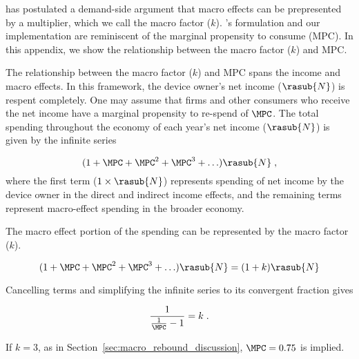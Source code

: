 
\citet{Borenstein:2015aa} has postulated a demand-side argument that macro effects 
can be prepresented by a multiplier, which we call the macro factor ($k$).
\citeauthor{Borenstein:2015aa}'s formulation and our implementation 
are reminiscent of the marginal propensity to consume (MPC).
In this appendix, we show the relationship between the macro factor ($k$) and MPC.

The relationship between the macro factor ($k$) and MPC spans
the income and macro effects.
In this framework, the device owner's net income ($\rasub{N}$) is respent completely.
One may assume that firms and other consumers who receive the net income have a 
marginal propensity to re-spend of $\MPC$.
The total spending throughout the economy of each year's net income ($\rasub{N}$)
is given by the infinite series

\begin{equation} \label{eq:infinite_series_spending}
  (1 + \MPC + \MPC^2 + \MPC^3 + \ldots) \rasub{N} \; ,
\end{equation}
%
where the first term ($1 \times \rasub{N}$) represents spending of net income by the device owner
in the direct and indirect income effects, and
the remaining terms represent macro-effect spending in the broader economy.

The macro effect portion of the spending can be represented by the macro factor ($k$).

\begin{equation} \label{eq:mpc_and_k}
  (1 + \MPC + \MPC^2 + \MPC^3 + \ldots) \rasub{N} = (1 + k) \rasub{N}
\end{equation}

Cancelling terms and simplifying the infinite series to its convergent fraction gives

\begin{equation} \label{eq:mpc_and_k_converged}
  \frac{1}{\frac{1}{\MPC} - 1} = k \; .
\end{equation}

If $k = 3$, as in Section~\ref{sec:macro_rebound_discussion}, 
$\MPC = 0.75$ is implied.
